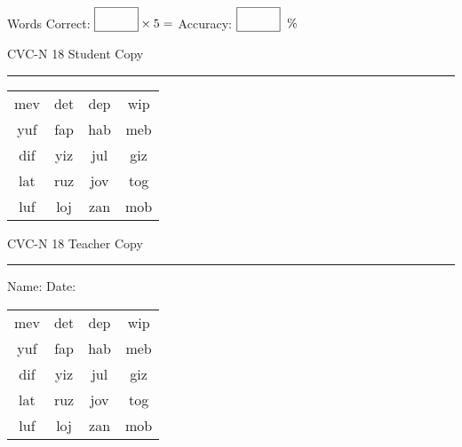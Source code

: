 \documentclass{memoir}
\begin{document}
\small

Words Correct: $\fbox{\phantom{\huge 100}} \times 5 = $ Accuracy: $\fbox{\phantom{\huge 100}}\;\; \%$ 

\vfill

\newpage


\footnotesize \noindent
CVC-N 18 \hfill Student Copy
\smallskip
\hrule

\Large

\setlength{\tabcolsep}{14pt}
\def\arraystretch{2}

{\selectfont


\begin{vplace}[0.5]
\begin{center}
\begin{tabular}{cccc}
mev & det & dep & wip \\
yuf & fap & hab & meb \\
dif & yiz & jul & giz \\
lat & ruz & jov & tog \\
luf & loj & zan & mob \\
\end{tabular}
\end{center}
\end{vplace}

}

\newpage

\footnotesize \noindent
CVC-N 18 \hfill Teacher Copy
\smallskip
\hrule

\small

\vfill

\noindent
Name: \underline{\hspace{1.75in}} \hfill Date: \underline{\hspace{1in}}

\Large

{\selectfont


\begin{vplace}[0.5]
\begin{center}
\begin{tabular}{cccc}
mev & det & dep & wip \\
yuf & fap & hab & meb \\
dif & yiz & jul & giz \\
lat & ruz & jov & tog \\
luf & loj & zan & mob \\
\end{tabular}
\end{center}
\end{vplace}



}
\end{document}
